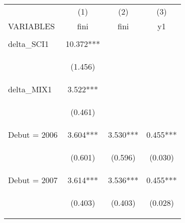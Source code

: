\begin{center}
\begin{tabular}{lccc} \hline
 & (1) & (2) & (3) \\
VARIABLES & fini & fini & y1 \\ \hline
\vspace{4pt} & \begin{footnotesize}\end{footnotesize} & \begin{footnotesize}\end{footnotesize} & \begin{footnotesize}\end{footnotesize} \\
delta\_SCI1 & 10.372*** &  &  \\
\vspace{4pt} & \begin{footnotesize}(1.456)\end{footnotesize} & \begin{footnotesize}\end{footnotesize} & \begin{footnotesize}\end{footnotesize} \\
delta\_MIX1 & 3.522*** &  &  \\
\vspace{4pt} & \begin{footnotesize}(0.461)\end{footnotesize} & \begin{footnotesize}\end{footnotesize} & \begin{footnotesize}\end{footnotesize} \\
Debut = 2006 & 3.604*** & 3.530*** & 0.455*** \\
\vspace{4pt} & \begin{footnotesize}(0.601)\end{footnotesize} & \begin{footnotesize}(0.596)\end{footnotesize} & \begin{footnotesize}(0.030)\end{footnotesize} \\
Debut = 2007 & 3.614*** & 3.536*** & 0.455*** \\
\vspace{4pt} & \begin{footnotesize}(0.403)\end{footnotesize} & \begin{footnotesize}(0.403)\end{footnotesize} & \begin{footnotesize}(0.028)\end{footnotesize} \\

\end{tabular}
\end{center}

